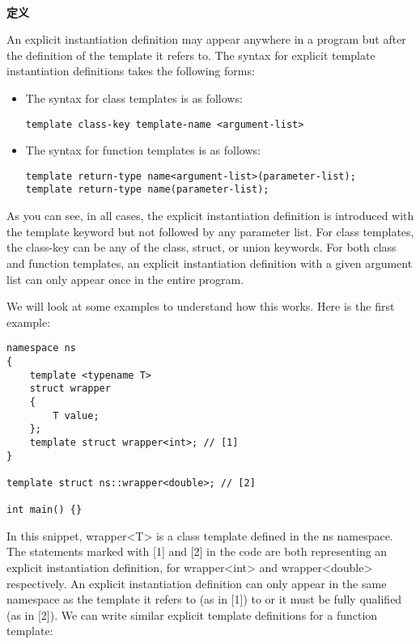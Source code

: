 \hspace*{\fill} \\ %
\noindent\textbf{定义}

An explicit instantiation definition may appear anywhere in a program but after the definition of the template it refers to. The syntax for explicit template instantiation definitions takes the following forms:

\begin{itemize}
\item 
The syntax for class templates is as follows:
\begin{lstlisting}[style=styleCXX]
template class-key template-name <argument-list>
\end{lstlisting}

\item 
The syntax for function templates is as follows:
\begin{lstlisting}[style=styleCXX]
template return-type name<argument-list>(parameter-list);
template return-type name(parameter-list);
\end{lstlisting}
\end{itemize}

As you can see, in all cases, the explicit instantiation definition is introduced with the template keyword but not followed by any parameter list. For class templates, the class-key can be any of the class, struct, or union keywords. For both class and function templates, an explicit instantiation definition with a given argument list can only appear once in the entire program.

We will look at some examples to understand how this works. Here is the first example:

\begin{lstlisting}[style=styleCXX]
namespace ns
{
	template <typename T>
	struct wrapper
	{
		T value;
	};
	template struct wrapper<int>; // [1]
}

template struct ns::wrapper<double>; // [2]

int main() {}
\end{lstlisting}

In this snippet, wrapper<T> is a class template defined in the ns namespace. The statements marked with [1] and [2] in the code are both representing an explicit instantiation definition, for wrapper<int> and wrapper<double> respectively. An explicit instantiation definition can only appear in the same namespace as the template it refers to (as in [1]) to or it must be fully qualified (as in [2]). We can write similar explicit template definitions for a function template:


